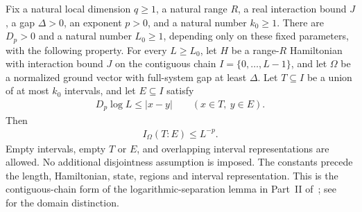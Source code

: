\begin{lemma}
    \label{thm:chain_logarithmic_separation}
    \leanok
    Fix a natural local dimension $q\ge1$, a natural range $R$, a real
    interaction bound $J$, a gap $\Delta>0$, an exponent $p>0$, and a
    natural number $k_0\ge1$.
    There are $D_p>0$ and a natural number $L_0\ge1$, depending only on
    these fixed parameters, with the following property.
    For every $L\ge L_0$, let $H$ be a range-$R$ Hamiltonian with
    interaction bound $J$ on the contiguous chain $I=\{0,\ldots,L-1\}$,
    and let $\Omega$ be a normalized ground vector with full-system gap
    at least $\Delta$.
    Let $T\subseteq I$ be a union of at most $k_0$ intervals, and let
    $E\subseteq I$ satisfy
    \begin{align}
        D_p\log L\le|x-y|\qquad(x\in T,\ y\in E).
    \end{align}
    Then
    \begin{align}
        I_\Omega(T:E)\le L^{-p}.
    \end{align}
    Empty intervals, empty $T$ or $E$, and overlapping interval
    representations are allowed. No additional disjointness assumption
    is imposed. The constants precede the length, Hamiltonian, state,
    regions and interval representation.
    This is the contiguous-chain form of the logarithmic-separation
    lemma in Part~II of~\cite{TNLean2026OneDimensional};
    see~\cite{gap:tnlean_one_dimensional_connected_domain_scope} for the
    domain distinction.
\end{lemma}
